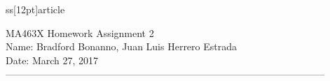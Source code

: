 ss[12pt]{article}


\usepackage[dvips]{graphics,color}
\usepackage{amsfonts}
\usepackage{amssymb}
\usepackage[fleqn]{amsmath}
\usepackage{latexsym}
\usepackage{enumerate}
\usepackage{tcolorbox}
\setlength{\parskip}{1pc}
\setlength{\parindent}{0pt}
\setlength{\topmargin}{-3pc}
\setlength{\textheight}{9.5in}
\setlength{\oddsidemargin}{0pc}
\setlength{\evensidemargin}{0pc}
\setlength{\textwidth}{6.5in}

\usepackage{graphicx}

\newcommand{\answer}[2]{
    \newpage
        \noindent
        \framebox{
            \vbox{
                Homework \hfill {\bf \problemset}
                    \name \hfill \today \\
            }
        }
    \bigskip

}



MA463X Homework Assignment 2\\
           Name: Bradford Bonanno, Juan Luis Herrero Estrada\\
           Date: March 27, 2017\\
           --------------------------------------------------------------------------------------------------

